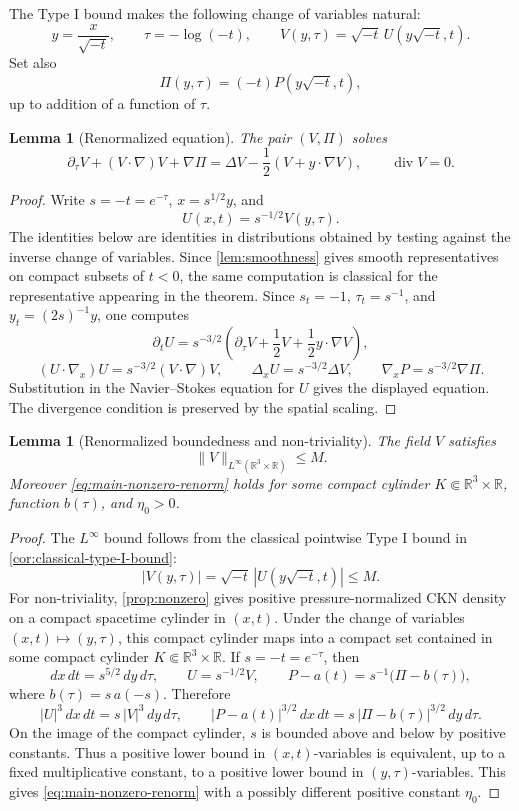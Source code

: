\documentclass[11pt]{amsart}
\theoremstyle{plain}
\newtheorem{lemma}[theorem]{Lemma}
\theoremstyle{definition}
\theoremstyle{remark}
\numberwithin{equation}{section}
\newcommand{\R}{\mathbb R}
\newcommand{\divergence}{\operatorname{div}}
\begin{document}
The Type I bound makes the following change of variables natural:
\[
   y=\frac{x}{\sqrt{-t}},\qquad
   \tau=-\log(-t),\qquad
   V(y,\tau)=\sqrt{-t}\,U(y\sqrt{-t},t).
\]
Set also
\[
   \Pi(y,\tau)=(-t)P(y\sqrt{-t},t),
\]
up to addition of a function of \(\tau\).

\begin{lemma}[Renormalized equation]\label{lem:renormalized-equation}
The pair \((V,\Pi)\) solves
\[
   \partial_\tau V+(V\cdot\nabla)V+\nabla\Pi
   =
   \Delta V-\frac12(V+y\cdot\nabla V),
   \qquad
   \divergence V=0.
\]
\end{lemma}

\begin{proof}
Write \(s=-t=e^{-\tau}\), \(x=s^{1/2}y\), and
\[
   U(x,t)=s^{-1/2}V(y,\tau).
\]
The identities below are identities in distributions obtained by testing
against the inverse change of variables.  Since \cref{lem:smoothness} gives
smooth representatives on compact subsets of \(t<0\), the same computation is
classical for the representative appearing in the theorem.
Since \(s_t=-1\), \(\tau_t=s^{-1}\), and \(y_t=(2s)^{-1}y\), one computes
\[
   \partial_tU
   =
   s^{-3/2}\left(\partial_\tau V+\frac12V+\frac12y\cdot\nabla V\right),
\]
\[
   (U\cdot\nabla_x)U=s^{-3/2}(V\cdot\nabla)V,\qquad
   \Delta_xU=s^{-3/2}\Delta V,\qquad
   \nabla_xP=s^{-3/2}\nabla\Pi.
\]
Substitution in the Navier--Stokes equation for \(U\) gives the displayed
equation.  The divergence condition is preserved by the spatial scaling.
\end{proof}

\begin{lemma}[Renormalized boundedness and non-triviality]
\label{lem:renorm-bounds}
The field \(V\) satisfies
\[
   \|V\|_{L^\infty(\R^3\times\R)}\le M.
\]
Moreover \eqref{eq:main-nonzero-renorm} holds for some compact cylinder
\(K\Subset\R^3\times\R\), function \(b(\tau)\), and \(\eta_0>0\).
\end{lemma}

\begin{proof}
The \(L^\infty\) bound follows from the classical pointwise Type I bound in
\cref{cor:classical-type-I-bound}:
\[
   |V(y,\tau)|
   =
   \sqrt{-t}\,|U(y\sqrt{-t},t)|
   \le M.
\]
For non-triviality, \cref{prop:nonzero} gives positive pressure-normalized CKN
density on a compact spacetime cylinder in \((x,t)\).  Under the change of
variables \((x,t)\mapsto(y,\tau)\), this compact cylinder maps into a compact
set contained in some compact cylinder \(K\Subset\R^3\times\R\).  If
\(s=-t=e^{-\tau}\), then
\[
   dx\,dt=s^{5/2}\,dy\,d\tau,\qquad
   U=s^{-1/2}V,\qquad
   P-a(t)=s^{-1}\bigl(\Pi-b(\tau)\bigr),
\]
where \(b(\tau)=s\,a(-s)\).  Therefore
\[
   |U|^3\,dx\,dt
   =
   s\,|V|^3\,dy\,d\tau,
   \qquad
   |P-a(t)|^{3/2}\,dx\,dt
   =
   s\,|\Pi-b(\tau)|^{3/2}\,dy\,d\tau .
\]
On the image of the compact cylinder, \(s\) is bounded above and below by
positive constants.  Thus a positive lower bound in \((x,t)\)-variables is
equivalent, up to a fixed multiplicative constant, to a positive lower bound
in \((y,\tau)\)-variables.  This gives \eqref{eq:main-nonzero-renorm} with a
possibly different positive constant \(\eta_0\).
\end{proof}
\end{document}

